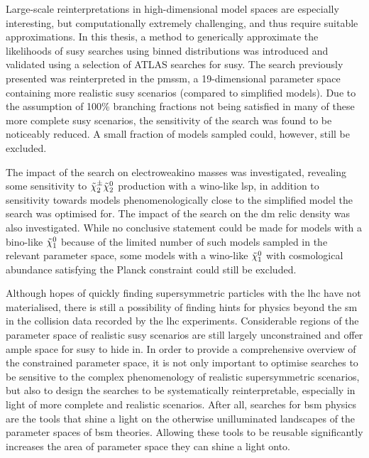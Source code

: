 Large-scale reinterpretations in high-dimensional model spaces are especially interesting, but computationally extremely challenging, and thus require suitable approximations. In this thesis, a method to generically approximate the likelihoods of \gls{susy} searches using binned distributions was introduced and validated using a selection of ATLAS searches for \gls{susy}.
The search previously presented was reinterpreted in the \gls{pmssm}, a 19-dimensional parameter space containing more realistic \gls{susy} scenarios (compared to simplified models). Due to the assumption of 100\% branching fractions not being satisfied in many of these more complete \gls{susy} scenarios, the sensitivity of the \onelepton search was found to be noticeably reduced. A small fraction of models sampled could, however, still be excluded.

The impact of the \onelepton search on electroweakino masses was investigated, revealing some sensitivity to $\tilde{\chi}_2^\pm\tilde{\chi}_2^0$ production with a wino-like \gls{lsp}, in addition to sensitivity towards models phenomenologically close to the simplified model the search was optimised for.
The impact of the \onelepton search on the \gls{dm} relic density was also investigated.
While no conclusive statement could be made for models with a bino-like $\tilde{\chi}_1^0$ because of the limited number of such models sampled in the relevant parameter space, some models with a wino-like $\tilde{\chi}_1^0$ with cosmological abundance satisfying the Planck constraint could still be excluded. 
 
 Although hopes of quickly finding supersymmetric particles with the \gls{lhc} have not materialised, there is still a possibility of finding hints for physics beyond the \gls{sm} in the collision data recorded by the \gls{lhc} experiments.
 Considerable regions of the parameter space of realistic \gls{susy} scenarios are still largely unconstrained and offer ample space for \gls{susy} to hide in.
 In order to provide a comprehensive overview of the constrained parameter space, it is not only important to optimise searches to be sensitive to the complex phenomenology of realistic supersymmetric scenarios, but also to design the searches to be systematically reinterpretable, especially in light of more complete and realistic scenarios.
 After all, searches for \gls{bsm} physics are the tools that shine a light on the otherwise unilluminated landscapes of the parameter spaces of \gls{bsm} theories.
 Allowing these tools to be reusable significantly increases the area of parameter space they can shine a light onto.    
 